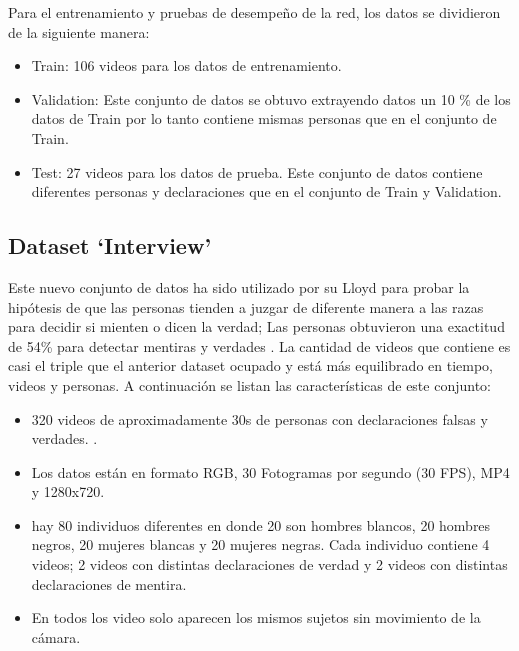 \begin{onehalfspacing}
Para el entrenamiento y pruebas de desempeño de la red, los datos se dividieron de la siguiente manera:

\begin{itemize}
    \item Train: 106 videos para los datos de entrenamiento.
    \item Validation: Este conjunto de datos se obtuvo extrayendo datos un 10 \% de los datos de Train por lo tanto contiene mismas personas que en el conjunto de Train.
    \item Test: 27 videos para los datos de prueba.  Este conjunto de datos contiene diferentes personas y declaraciones que en el conjunto de Train y Validation.
\end{itemize}



\subsection{Dataset `Interview'}
\label{sec:DatasetInterview}

Este nuevo conjunto de datos ha sido utilizado por su Lloyd \cite{Lloyd2019MiamiDatabase} para probar la hipótesis de que las personas tienden a juzgar de diferente manera a las razas para decidir si mienten o dicen la verdad; Las personas obtuvieron una exactitud de 54\% para detectar mentiras y verdades \cite{Lloyd2019MiamiDatabase}. La cantidad de videos que contiene es casi el triple que el anterior dataset ocupado y está más equilibrado en tiempo, videos y personas. A continuación se listan las características de este conjunto:\\


\begin{itemize}
    \item 320 videos de aproximadamente 30s de personas con declaraciones falsas y verdades. .
    \item Los datos están en formato RGB, 30 Fotogramas por segundo (30 FPS), MP4 y 1280x720.
    \item hay 80 individuos diferentes en donde 20 son hombres blancos, 20 hombres negros, 20 mujeres blancas y 20 mujeres negras. Cada individuo contiene 4 videos; 2 videos con distintas declaraciones de verdad y 2 videos con distintas declaraciones de mentira.
    \item En todos los video solo aparecen los mismos sujetos sin movimiento de la cámara.
\end{itemize}


\end{onehalfspacing}
